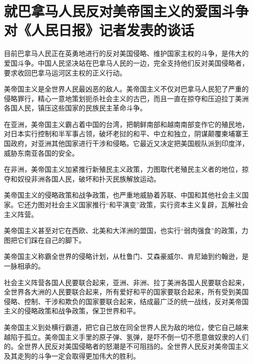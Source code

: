 \section[就巴拿马人民反对美帝国主义的爱国斗争对《人民日报》记者发表的谈话（一九六四年一月十二日）]{就巴拿马人民反对美帝国主义的爱国斗争对《人民日报》记者发表的谈话}


目前巴拿马人民正在英勇地进行的反对美国侵略、维护国家主权的斗争，是伟大的爱国斗争。中国人民坚决站在巴拿马人民的一边，完全支持他们反对美国侵略者，要求收回巴拿马运河区主权的正义行动。

美帝国主义是全世界人民最凶恶的敌人。美帝国主义不仅对巴拿马人民犯了严重的侵略罪行，精心一意地策划扼杀社会主义的古巴，而且一直在掠夺和压迫拉丁美洲各国人民，镇压这些国家的民族民主革命斗争。

在亚洲，美帝国主义霸占着中国的台湾，把朝鲜南部和越南南部变作它的殖民地，对日本实行控制和半军事占领，破坏老挝的和平、中立和独立，阴谋颠覆柬埔寨王国政府，对亚洲其他国家进行干涉和侵略。它最近又决定把美国舰队派到印度洋，威胁东南亚各国的安全。

在非洲，美帝国主义加紧推行新殖民主义政策，力图取代老殖民主义者的地位，掠夺和奴役非洲各国人民，破坏和扑灭民族解放运动。

美帝国主义的侵略政策和战争政策，也严重地威胁着苏联、中国和其他社会主义国家。它还力图对社会主义国家推行“和平演变”政策，实行资本主义复辟，瓦解社会主义阵营。

美帝国主义甚至对它在西欧、北美和大洋洲的盟国，也实行“弱肉强食”的政策，力图把它们踩在自己的脚下。

美帝国主义称霸全世界的侵略计划，从杜鲁门、艾森豪威尔、肯尼廸到约翰逊，是一脉相承的。

社会主义阵营各国人民要联合起来，亚洲、非洲、拉丁美洲各国人民要联合起来，全世界各大洲的人民要联合起来，所有爱好和平的国家要联合起来，所有受到美国侵略、控制、干涉和欺负的国家要联合起来，结成最广泛的统一战线，反对美帝国主义的侵略政策和战争政策，保卫世界和平。

美帝国主义到处横行霸道，把它自己放在同全世界人民为敌的地位，使它自己越来越陷于孤立。美帝国主义手里的原子弹、氢弹，是吓不倒一切不愿意做奴隶的人们的。全世界人民反对美国侵略者的怒潮是不可阻挡的。全世界人民反对美帝国主义及其走狗的斗争一定会取得更加伟大的胜利。



